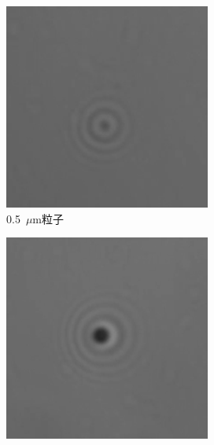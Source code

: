 \documentclass[a4paper]{report} %
\begin{document}
\begin{figure}[H]
    \centering
    \begin{subfigure}{0.3\textwidth}
        \includegraphics[width=\linewidth]{0.5um.png}
        \caption{0.5~$\mu$m粒子}
    \end{subfigure}
    \begin{subfigure}{0.3\textwidth}
        \includegraphics[width=\linewidth]{2um.png}

\end{subfigure}
\end{figure}
\end{document}

